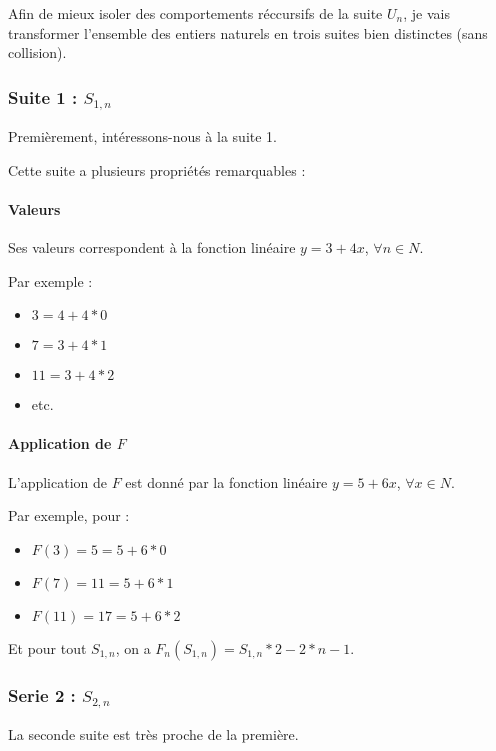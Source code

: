 \documentclass{book}
\begin{document}
Afin de mieux isoler des comportements r\'eccursifs de la suite $U_n$, je vais transformer l'ensemble des entiers naturels en trois suites bien distinctes (sans collision).

\subsubsection{Suite 1 : $S_{1,n}$}

Premi\`erement, int\'eressons-nous \`a la suite 1.

Cette suite a plusieurs propri\'et\'es remarquables :

\paragraph{Valeurs}

Ses valeurs correspondent à la fonction lin\'eaire $y = 3 + 4x$, $\forall n \in N$.

Par exemple :

\begin{itemize}
	\item $3 = 4 + 4 * 0$
	\item $7 = 3 + 4 * 1$
	\item $11 = 3 + 4 * 2$
	\item etc.
\end{itemize}

\paragraph{Application de $F$}

L'application de $F$ est donn\'e par la fonction lin\'eaire $y = 5 + 6x$, $\forall x \in N$.

Par exemple, pour :

\begin{itemize}
	\item $F(3) = 5 = 5 + 6 * 0$
	\item $F(7) = 11 = 5 + 6 * 1$
	\item $F(11) = 17 = 5 + 6 * 2$
\end{itemize}

Et pour tout $S_{1,n}$, on a $F_n(S_{1,n}) = S_{1,n} * 2 - 2 * n - 1$.

\subsubsection{Serie 2 : $S_{2,n}$}

La seconde suite est tr\`es proche de la premi\`ere.
\end{document}
